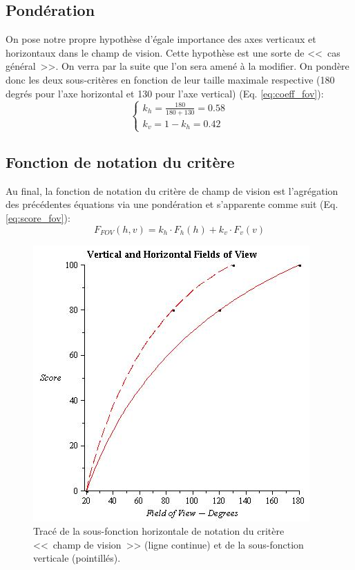 	\subsection{Pondération}
	\par On pose notre propre hypothèse d'égale importance des axes verticaux et horizontaux dans le champ de vision. Cette hypothèse est une sorte de <<~cas général~>>. On verra par la suite que l'on sera amené à la modifier. On pondère donc les deux sous-critères en fonction de leur taille maximale respective (180 degrés pour l'axe horizontal et 130 pour l'axe vertical) (Eq. \ref{eq:coeff_fov}):
	\begin{equation}
		\begin{cases}	
			k_h = \frac{180}{180 + 130} = 0.58\\
			k_v = 1 - k_h = 0.42
		\end{cases}
		\label{eq:coeff_fov}
	\end{equation}
	
	\subsection{Fonction de notation du critère}
	\par Au final, la fonction de notation du critère de champ de vision est l'agrégation des précédentes équations via une pondération et s'apparente comme suit (Eq. \ref{eq:score_fov}):
	\begin{equation}
	F_{FOV}(h,v) = k_h \cdot F_h(h) + k_v \cdot F_v(v)
	\label{eq:score_fov}
	\end{equation}

	\begin{figure}
		\centering
		\includegraphics[scale=1]{Figures/FOV}
		\caption{Tracé de la sous-fonction horizontale de notation du critère <<~champ de vision~>> (ligne continue) et de la sous-fonction verticale (pointillés).}
		\label{fig:score_fov}
	\end{figure}
	
